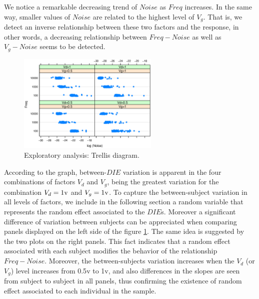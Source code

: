 \documentclass[sn-mathphys]{sn-jnl}%
\theoremstyle{thmstyleone}%
\theoremstyle{thmstyletwo}%
\theoremstyle{thmstylethree}%
\begin{document}
We notice a remarkable decreasing trend of $Noise$ as $Freq$ increases. In the same way, smaller values of $Noise$ are related to the highest level of $V_g$. That is, we detect an inverse relationship between these two factors and the response, in other words, a decreasing relationship between $Freq-Noise$ as well as $V_g-Noise$ seems to be detected. 

\begin{figure}[ht]
	\centerline{
		\includegraphics[width=0.6\textwidth]{Fig2_trellis2.eps}}
	\caption{Exploratory analysis: Trellis diagram. }
	\label{fig:trellis2}
\end{figure}

 
According to the graph, between-$DIE$ variation is apparent in the four combinations of factors $V_d$ and $V_g$, being the greatest variation for the combination $V_d=1 \rm{v}$ and $V_g=1 \rm{v}$. To capture the between-subject variation in all levels of factors, we include in the following section a random variable that represents the random effect associated to the $DIE$s.
Moreover a significant difference of variation between subjects can be appreciated when comparing panels displayed on the left side of the figure \ref{fig:trellis2}. The same idea is suggested by the two plots on the right panels. This fact indicates that a random effect associated with each subject modifies the behavior of the relationship $Freq-Noise$. Moreover, the between-subjects variation increases when the $V_d$ (or $V_g$) level increases from 0.5\rm{v} to 1\rm{v}, and also differences in the slopes are seen from subject to subject in all panels, thus confirming the existence of random effect associated to each individual in the sample.

\end{document}
